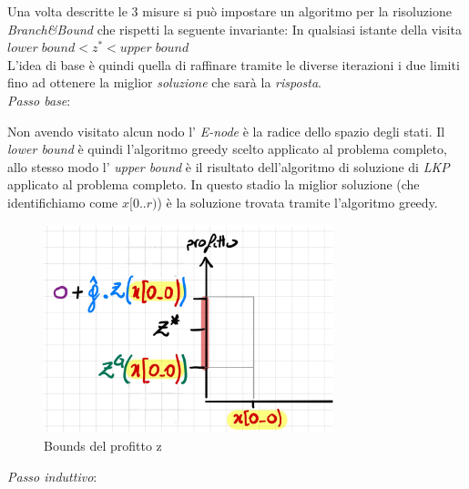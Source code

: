 \documentclass[a4paper]{article}
\begin{document}
Una volta descritte le 3 misure si può impostare un algoritmo per la risoluzione \textit{Branch\&Bound} che rispetti la seguente invariante: In qualsiasi istante della visita $lower \; bound < z^* < upper \; bound$\\
L'idea di base è quindi quella di raffinare tramite le diverse iterazioni i due limiti fino ad ottenere la miglior \emph{soluzione} che sarà la \emph{risposta}.\\
\textit{Passo base}:
\begin{adjustwidth}{.8cm}{0cm}
		Non avendo visitato alcun nodo l' \textit{E-node} è la radice dello spazio degli stati.
		Il \textit{lower bound} è quindi l'algoritmo greedy scelto applicato al problema completo, allo stesso modo l' \textit{upper bound} è il risultato dell'algoritmo di soluzione di \emph{LKP} applicato al problema completo.
		In questo stadio la miglior soluzione (che identifichiamo come $x[0..r)$) è la soluzione trovata tramite l'algoritmo greedy.
\begin{figure}[!ht]
\centering
\includegraphics[width=0.75\textwidth]{./img/C14_profitto_z.png}
\caption{Bounds del profitto z} \label{FIG:C14_profitto_z}
\end{figure}
\end{adjustwidth}
\textit{Passo induttivo}:
\end{document}
